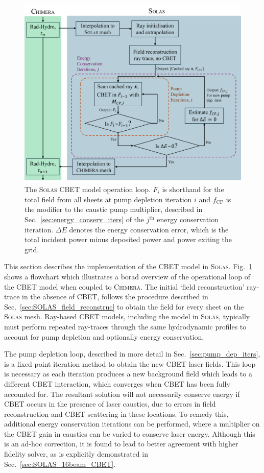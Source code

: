\begin{figure}[t!]
    \includegraphics[width=0.9\linewidth]{Numerics/Images/CBET_flowchart.PNG}
    \centering
    \caption{The \textsc{Solas} \ac{CBET} model operation loop.
    $F_i$ is shorthand for the total field from all sheets at pump depletion iteration $i$ and $f_{\text{CP}}$ is the modifier to the caustic pump multiplier, described in Sec.~\ref{sec:energy_conserv_iters} of the $j^{\text{th}}$ energy conservation iteration.
    $\Delta E$ denotes the energy conservation error, which is the total incident power minus deposited power and power exiting the grid.}%
    \label{fig:SOLAS_CBET_flowchart}
\end{figure}

This section describes the implementation of the \ac{CBET} model in \textsc{Solas}.
Fig.~\ref{fig:SOLAS_CBET_flowchart} shows a flowchart which illustrates a borad overview of the operational loop of the \ac{CBET} model when coupled to \textsc{Chimera}.
The initial `field reconstruction' ray-trace in the absence of \ac{CBET}, follows the procedure described in Sec.~\ref{sec:SOLAS_field_reconstruc} to obtain the field for every sheet on the \textsc{Solas} mesh.
Ray-based \ac{CBET} models, including the model in \textsc{Solas}, typically must perform repeated ray-traces through the same hydrodynamic profiles to account for pump depletion and optionally energy conservation.

The pump depletion loop, described in more detail in Sec.~\ref{sec:pump_dep_iters}, is a fixed point iteration method to obtain the new \ac{CBET} laser fields.
This loop is necessary as each iteration produces a new background field which leads to a different \ac{CBET} interaction, which converges when \ac{CBET} has been fully accounted for.
The resultant solution will not necessarily conserve energy if \ac{CBET} occurs in the presence of laser caustics, due to errors in field reconstruction and \ac{CBET} scattering in these locations.
To remedy this, additional energy conservation iterations can be performed, where a multiplier on the \ac{CBET} gain in caustics can be varied to conserve laser energy.
Although this is an ad-hoc correction, it is found to lead to better agreement with higher fidelity solver, as is explicitly demonstrated in Sec.~\ref{sec:SOLAS_16beam_CBET}.

